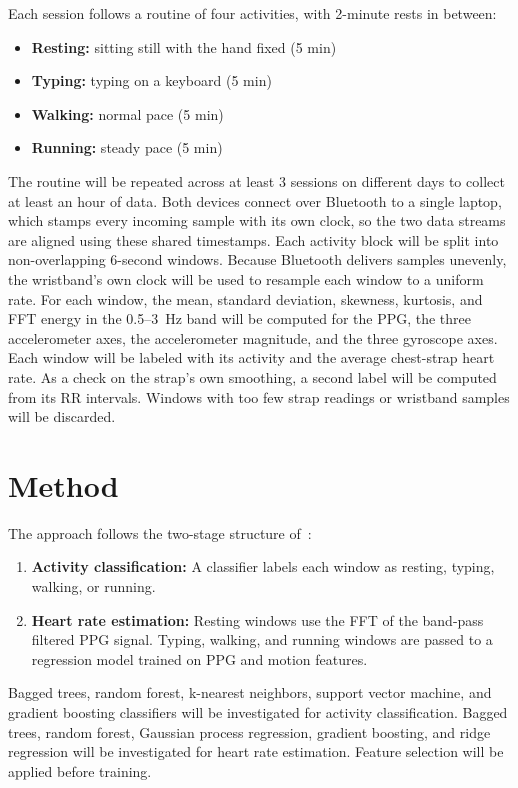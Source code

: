 \documentclass[conference]{IEEEtran}
\begin{document}
Each session follows a routine of four activities, with 2-minute rests in between:
\begin{itemize}
    \item \textbf{Resting:} sitting still with the hand fixed (5 min)
    \item \textbf{Typing:} typing on a keyboard (5 min)
    \item \textbf{Walking:} normal pace (5 min)
    \item \textbf{Running:} steady pace (5 min)
\end{itemize}

The routine will be repeated across at least 3 sessions on different days to collect at least an hour of data. Both devices connect over Bluetooth to a single laptop, which stamps every incoming sample with its own clock, so the two data streams are aligned using these shared timestamps. Each activity block will be split into non-overlapping 6-second windows. Because Bluetooth delivers samples unevenly, the wristband's own clock will be used to resample each window to a uniform rate. For each window, the mean, standard deviation, skewness, kurtosis, and FFT energy in the 0.5--3~Hz band will be computed for the PPG, the three accelerometer axes, the accelerometer magnitude, and the three gyroscope axes. Each window will be labeled with its activity and the average chest-strap heart rate. As a check on the strap's own smoothing, a second label will be computed from its RR intervals. Windows with too few strap readings or wristband samples will be discarded.

\section{Method}
The approach follows the two-stage structure of~\cite{vicente2023}:
\begin{enumerate}
    \item \textbf{Activity classification:} A classifier labels each window as resting, typing, walking, or running.
    \item \textbf{Heart rate estimation:} Resting windows use the FFT of the band-pass filtered PPG signal. Typing, walking, and running windows are passed to a regression model trained on PPG and motion features.
\end{enumerate}
Bagged trees, random forest, k-nearest neighbors, support vector machine, and gradient boosting classifiers will be investigated for activity classification. Bagged trees, random forest, Gaussian process regression, gradient boosting, and ridge regression will be investigated for heart rate estimation. Feature selection will be applied before training.
\end{document}
